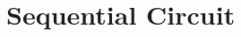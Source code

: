 \documentclass[a4paper,oneside,11pt,ngerman,english]{scrartcl}
\begin{document}
\maketitle


\tableofcontents




\section{Sequential Circuit}\label{section:sequential-circuit}



\end{document}
